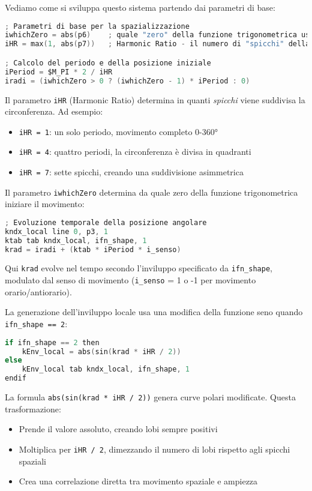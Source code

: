 Vediamo come si sviluppa questo sistema partendo dai parametri di base:

\begin{lstlisting}[language=C]
; Parametri di base per la spazializzazione
iwhichZero = abs(p6)    ; quale "zero" della funzione trigonometrica usare
iHR = max(1, abs(p7))   ; Harmonic Ratio - il numero di "spicchi" della circonferenza

; Calcolo del periodo e della posizione iniziale
iPeriod = $M_PI * 2 / iHR
iradi = (iwhichZero > 0 ? (iwhichZero - 1) * iPeriod : 0)
\end{lstlisting}

Il parametro \texttt{iHR} (Harmonic Ratio) determina in quanti \textit{spicchi} viene suddivisa la circonferenza. Ad esempio:
\begin{itemize}
 \item \texttt{iHR = 1}: un solo periodo, movimento completo 0-360°
 \item \texttt{iHR = 4}: quattro periodi, la circonferenza è divisa in quadranti
 \item \texttt{iHR = 7}: sette spicchi, creando una suddivisione asimmetrica
\end{itemize}

Il parametro \texttt{iwhichZero} determina da quale zero della funzione trigonometrica iniziare il movimento:

\begin{lstlisting}[language=C]
; Evoluzione temporale della posizione angolare
kndx_local line 0, p3, 1
ktab tab kndx_local, ifn_shape, 1
krad = iradi + (ktab * iPeriod * i_senso)
\end{lstlisting}

Qui \texttt{krad} evolve nel tempo secondo l'inviluppo specificato da \texttt{ifn\_shape}, modulato dal senso di movimento (\texttt{i\_senso} = 1 o -1 per movimento orario/antiorario).

La generazione dell'inviluppo locale usa una modifica della funzione seno quando \texttt{ifn\_shape == 2}:

\begin{lstlisting}[language=C]
if ifn_shape == 2 then
    kEnv_local = abs(sin(krad * iHR / 2))
else
    kEnv_local tab kndx_local, ifn_shape, 1
endif
\end{lstlisting}

La formula \texttt{abs(sin(krad * iHR / 2))} genera curve polari modificate. Questa trasformazione:
\begin{itemize}
 \item Prende il valore assoluto, creando lobi sempre positivi
 \item Moltiplica per \texttt{iHR / 2}, dimezzando il numero di lobi rispetto agli spicchi spaziali
 \item Crea una correlazione diretta tra movimento spaziale e ampiezza
\end{itemize}

